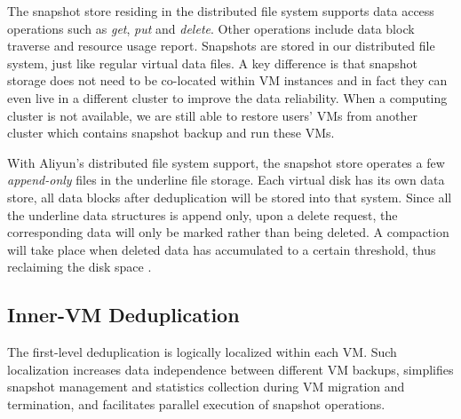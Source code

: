 The snapshot store  residing in the distributed file system
supports data access operations  such as \emph{get}, \emph{put} and \emph{delete}.
Other operations include data block traverse  and resource usage  report.
Snapshots are stored  in our distributed file system, just like regular virtual data files. 
A key  difference is that snapshot storage does not need to be
co-located within VM instances and  in fact they can even live in a different cluster to improve the 
data reliability. When a computing cluster is not available, we are still able to  restore users' VMs from another cluster which
contains snapshot backup and run these VMs. 

With Aliyun's distributed file system support, the snapshot store operates a few \emph{append-only} files
in the underline file storage. Each virtual disk has its own data store, all data 
blocks after deduplication will be stored into that system.
Since all the underline data structures is append only,
upon a delete request, the corresponding data will only be marked rather than being deleted.
A compaction will take place when deleted data has accumulated to a certain threshold, thus 
reclaiming the disk space .





\subsection{Inner-VM Deduplication}
\label{sect:innerVM}

The first-level deduplication is logically localized within each VM.
Such localization increases data independence between different  VM backups,
simplifies  snapshot  management and statistics collection during VM migration and termination,
and facilitates parallel execution of snapshot operations.

